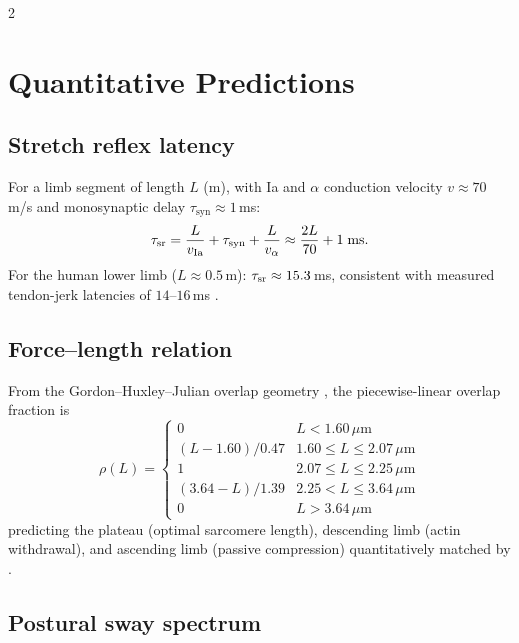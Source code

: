\begin{multicols}{2}
\section{Quantitative Predictions}
\label{sec:ch06-predictions}

\subsection{Stretch reflex latency}

For a limb segment of length $L$ (m), with Ia and $\alpha$ conduction
velocity $v \approx 70$\,m/s and monosynaptic delay $\tau_{\mathrm{syn}}
\approx 1$\,ms:
\begin{equation}
  \tau_{\mathrm{sr}} = \frac{L}{v_{\mathrm{Ia}}} + \tau_{\mathrm{syn}} + \frac{L}{v_\alpha}
         \approx \frac{2L}{70} + 1\;\text{ms.}
  \label{eq:ch06-tausr}
\end{equation}
For the human lower limb ($L \approx 0.5$\,m): $\tau_{\mathrm{sr}} \approx 15.3$\,ms,
consistent with measured tendon-jerk latencies of $14$--$16$\,ms
\citep{matthews1990,kandel2013}.

\subsection{Force--length relation}

From the Gordon--Huxley--Julian overlap geometry \citep{gordon1966}, the
piecewise-linear overlap fraction is
\begin{equation}
  \rho(L) = \begin{cases}
    0                          & L < 1.60\,\mu\mathrm{m}\\
    (L-1.60)/0.47              & 1.60 \le L \le 2.07\,\mu\mathrm{m}\\
    1                          & 2.07 \le L \le 2.25\,\mu\mathrm{m}\\
    (3.64 - L)/1.39            & 2.25 < L \le 3.64\,\mu\mathrm{m}\\
    0                          & L > 3.64\,\mu\mathrm{m}
  \end{cases}
  \label{eq:ch06-overlap}
\end{equation}
predicting the plateau (optimal sarcomere length), descending limb (actin
withdrawal), and ascending limb (passive compression) quantitatively matched
by \citep{gordon1966,piazzesi2007}.

\subsection{Postural sway spectrum}


\end{multicols}
